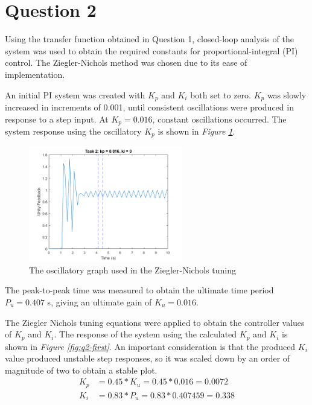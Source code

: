 \documentclass[11pt, onecolumn]{article}
\begin{document}
\section*{Question 2}
\par Using the transfer function obtained in Question 1, closed-loop analysis of the system was used to obtain the required constants for proportional-integral (PI) control. The Ziegler-Nichols method was chosen due to its ease of implementation.
\par An initial PI system was created with $K_p$ and $K_i$ both set to zero. $K_p$ was slowly increased in increments of 0.001, until consistent oscillations were produced in response to a step input. At $K_p = 0.016$, constant oscillations occurred. The system response using the oscillatory $K_p$ is shown in \textit{Figure \ref{fig:q2-oscillatory}}.
\newpage
\begin{figure}[h!]
    \centering
    \includegraphics[width=0.6\textwidth]{q2-g1.png}
    \caption{The oscillatory graph used in the Ziegler-Nichols tuning}
    \label{fig:q2-oscillatory}
\end{figure}
\par The peak-to-peak time was measured to obtain the ultimate time period $P_u = 0.407$ s, giving an ultimate gain of $K_u = 0.016$.
\par The Ziegler Nichols tuning equations were applied to obtain the controller values of $K_p$ and $K_i$. The response of the system using the calculated $K_p$ and $K_i$ is shown in \textit{Figure \ref{fig:q2-first}}. An important consideration is that the produced $K_i$ value produced unstable step responses, so it was scaled down by an order of magnitude of two to obtain a stable plot.
\begin{align*}
    K_p & = 0.45 * K_u = 0.45 * 0.016 = 0.0072   \\
    K_i & = 0.83 * P_u = 0.83 * 0.407459 = 0.338
\end{align*}
\end{document}
